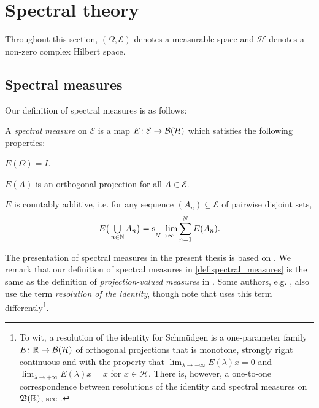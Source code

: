 \documentclass[article, a4paper, 11pt, oneside]{memoir}
\numberwithin{equation}{chapter}
\newcommand{\calH}{\mathcal{H}}
\newcommand{\calE}{\mathcal{E}}
\DeclareMathOperator*{\slim}{s-lim}
\theoremstyle{myexample}
\theoremstyle{myexample}
\theoremstyle{myexamplebreak}
\theoremstyle{myexamplebreak}
\theoremstyle{nonumberplain}
\theoremstyle{MyNonumberplain}
\begin{document}
\chapter{Spectral theory}

Throughout this section, $(\Omega, \calE)$ denotes a measurable space and $\calH$ denotes a non-zero complex Hilbert space.

\section{Spectral measures}
\label{sec:app_spectral_measures}

Our definition of spectral measures is as follows:

\begin{definition}
    \label{def:spectral_measures}
    A \emph{spectral measure} on $\calE$ is a map $E \colon \calE \to \boundedop(\calH)$ which satisfies the following properties:
    
    \begin{enumdef}
        \item $E(\Omega) = I$.
        
        \item $E(A)$ is an orthogonal projection for all $A \in \calE$.
        
        \item $E$ is countably additive, i.e. for any sequence $(A_n) \subseteq \calE$ of pairwise disjoint sets,
        \begin{equation*}
            E \big( \bigunion_{n \in \setN} A_n \big)
                = \slim_{N \to \infty} \sum_{n=1}^N E(A_n).
        \end{equation*}
        \label{enum:spectral_measure_additive}
    \end{enumdef}
\end{definition}
%
The presentation of spectral measures in the present thesis is based on \textcite[Section~4.2]{schmudgen2012}. We remark that our definition of spectral measures in \cref{def:spectral_measures} is the same as the definition of \emph{projection-valued measures} in \textcite[Section~VII.3]{reedsimon1}. Some authors, e.g. \textcite[Definition~12.17]{rudinfunctional}, also use the term \emph{resolution of the identity}, though note that \textcite[Definition~4.1]{schmudgen2012} uses this term differently\footnote{To wit, a resolution of the identity for Schmüdgen is a one-parameter family $E \colon \setR \to \boundedop(\calH)$ of orthogonal projections that is monotone, strongly right continuous and with the property that $\lim_{\lambda \to -\infty} E(\lambda)x = 0$ and $\lim_{\lambda \to +\infty} E(\lambda)x = x$ for $x \in \calH$. There is, however, a one-to-one correspondence between resolutions of the identity and spectral measures on $\mathfrak{B}(\mathbb{R})$, see \textcite[Theorem~4.6]{schmudgen2012}.}.
\end{document}
